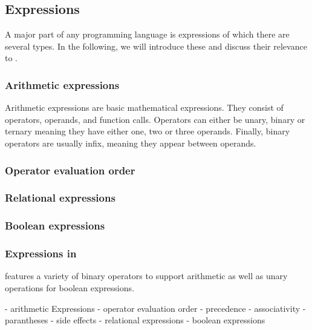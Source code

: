 \subsection{Expressions}
A major part of any programming language is expressions of which there are several types.
In the following, we will introduce these and discuss their relevance to \dazel{}.

\subsubsection*{Arithmetic expressions}
Arithmetic expressions are basic mathematical expressions. 
They consist of operators, operands, and function calls. 
Operators can either be unary, binary or ternary meaning they have either one, two or three operands.
Finally, binary operators are usually infix, meaning they appear between operands.

\subsubsection*{Operator evaluation order}


\subsubsection*{Relational expressions}


\subsubsection*{Boolean expressions}

\subsubsection*{Expressions in \dazel{}}
\dazel{} features a variety of binary operators to support arithmetic as well as unary operations for boolean expressions.

- arithmetic Expressions
- operator evaluation order
	- precedence
	- associativity
	- parantheses
	- side effects
- relational expressions
- boolean expressions
